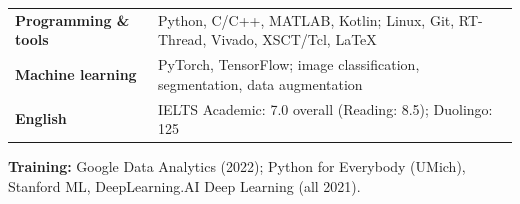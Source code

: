 \begin{tabularx}{\linewidth}{@{}>{\bfseries}l >{\raggedright\arraybackslash}X@{}}
  Programming \& tools & Python, C/C++, MATLAB, Kotlin; Linux, Git, RT-Thread, Vivado, XSCT/Tcl, \LaTeX \\
  Machine learning & PyTorch, TensorFlow; image classification, segmentation, data augmentation \\
  English & IELTS Academic: 7.0 overall (Reading: 8.5); Duolingo: 125
\end{tabularx}\par
{\small\textbf{Training:} Google Data Analytics (2022); Python for Everybody (UMich), Stanford ML, DeepLearning.AI Deep Learning (all 2021).}
